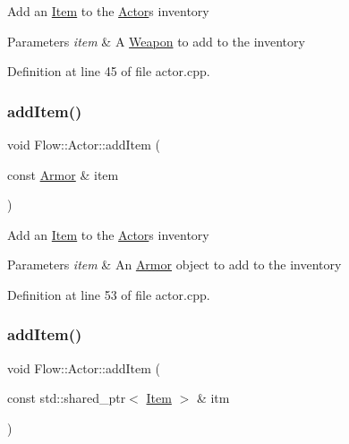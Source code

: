 Add an \hyperlink{class_flow_1_1_item}{Item} to the \hyperlink{class_flow_1_1_actor}{Actor}\textquotesingle{}s inventory 
\begin{DoxyParams}{Parameters}
{\em item} & A \hyperlink{class_flow_1_1_weapon}{Weapon} to add to the inventory \\
\hline
\end{DoxyParams}


Definition at line 45 of file actor.\+cpp.

\hypertarget{class_flow_1_1_actor_ae27354156a8ea17e3141c087996e6d79}{}\label{class_flow_1_1_actor_ae27354156a8ea17e3141c087996e6d79} 
\subsubsection{\texorpdfstring{add\+Item()}{addItem()}\hspace{0.1cm}{\footnotesize\ttfamily [3/4]}}
{\footnotesize\ttfamily void Flow\+::\+Actor\+::add\+Item (\begin{DoxyParamCaption}\item[{const \hyperlink{class_flow_1_1_armor}{Armor} \&}]{item }\end{DoxyParamCaption})}

Add an \hyperlink{class_flow_1_1_item}{Item} to the \hyperlink{class_flow_1_1_actor}{Actor}\textquotesingle{}s inventory 
\begin{DoxyParams}{Parameters}
{\em item} & An \hyperlink{class_flow_1_1_armor}{Armor} object to add to the inventory \\
\hline
\end{DoxyParams}


Definition at line 53 of file actor.\+cpp.

\hypertarget{class_flow_1_1_actor_a0c00bc33f98a815227a665fb4d61664d}{}\label{class_flow_1_1_actor_a0c00bc33f98a815227a665fb4d61664d} 
\subsubsection{\texorpdfstring{add\+Item()}{addItem()}\hspace{0.1cm}{\footnotesize\ttfamily [4/4]}}
{\footnotesize\ttfamily void Flow\+::\+Actor\+::add\+Item (\begin{DoxyParamCaption}\item[{const std\+::shared\+\_\+ptr$<$ \hyperlink{class_flow_1_1_item}{Item} $>$ \&}]{itm }\end{DoxyParamCaption})}

